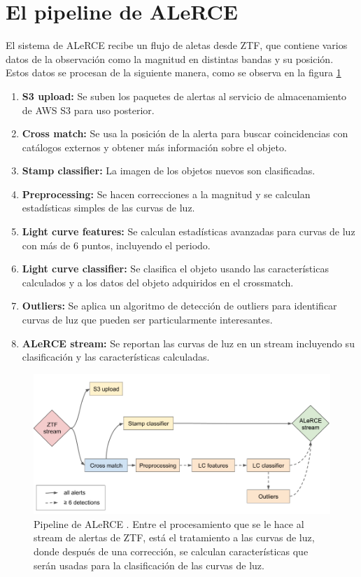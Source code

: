 \section{El pipeline de ALeRCE}\label{sec:alerce-pipeline}
El sistema de ALeRCE recibe un flujo de aletas desde ZTF, que contiene varios datos de la observación como la magnitud en distintas bandas y su posición. Estos datos se procesan de la siguiente manera, como se observa en la figura \ref{fig:pipeline} \cite{lightcurve-classifier}
\begin{enumerate}
    \item  {\bf S3 upload:} Se suben los paquetes de alertas al servicio de almacenamiento de AWS S3 para uso posterior.
    \item {\bf Cross match:} Se usa la posición de la alerta para buscar coincidencias con catálogos externos y obtener más información sobre el objeto.
    \item {\bf Stamp classifier:} La imagen de los objetos nuevos son clasificadas.
    \item {\bf Preprocessing:} Se hacen correcciones a la magnitud y se calculan estadísticas simples de las curvas de luz.
    \item {\bf Light curve features:} Se calculan estadísticas avanzadas para curvas de luz con más de 6 puntos, incluyendo el periodo.
    \item {\bf Light curve classifier:} Se clasifica el objeto usando las características calculados y a los datos del objeto adquiridos en el crossmatch.
    \item {\bf Outliers:} Se aplica un algoritmo de detección de outliers para identificar curvas de luz que pueden ser particularmente interesantes.
    \item {\bf ALeRCE stream:} Se reportan las curvas de luz en un stream incluyendo su clasificación y las características calculadas.
\end{enumerate}
\begin{figure}[H]
    \centering
    \includegraphics[scale=0.45]{pipeline.png}
    \caption{Pipeline de ALeRCE \cite{alerce-intro}. Entre el procesamiento que se le hace al stream de alertas de ZTF, está el tratamiento a las curvas de luz, donde después de una corrección, se calculan características que serán usadas para la clasificación de las curvas de luz.}
    \label{fig:pipeline}
\end{figure}
